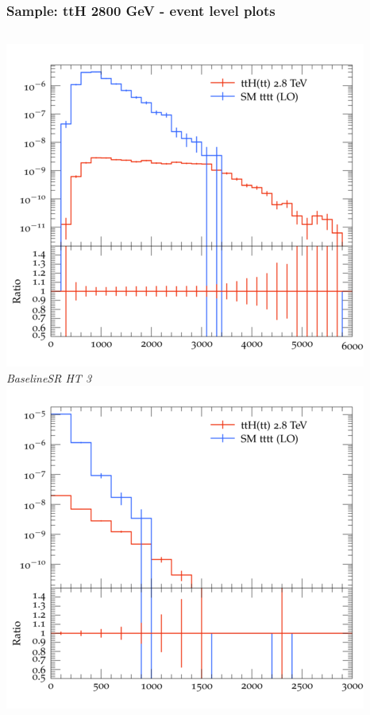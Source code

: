 \documentclass{beamer}
\begin{document}
\begin{frame}
\frametitle{Sample: ttH 2800 GeV - event level plots}
\begin{columns}
\includegraphics[width=\textwidth]{../plots/ttH_2800/tttt_ttH_1LOS/BaselineSR_HT_3.png}\\
\textit{\small BaselineSR HT 3}
\includegraphics[width=\textwidth]{../plots/ttH_2800/tttt_ttH_1LOS/BaselineSR_MET.png}\\

\end{columns}
\end{frame}
\end{document}
